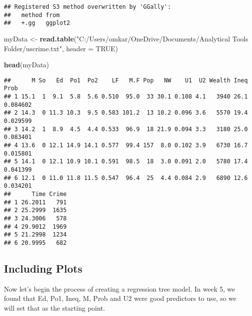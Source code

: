 \documentclass[
]{article}
\newenvironment{Shaded}{\begin{snugshade}}{\end{snugshade}}
\newcommand{\AttributeTok}[1]{\textcolor[rgb]{0.13,0.29,0.53}{#1}}
\newcommand{\ConstantTok}[1]{\textcolor[rgb]{0.56,0.35,0.01}{#1}}
\newcommand{\FunctionTok}[1]{\textcolor[rgb]{0.13,0.29,0.53}{\textbf{#1}}}
\newcommand{\NormalTok}[1]{#1}
\newcommand{\OtherTok}[1]{\textcolor[rgb]{0.56,0.35,0.01}{#1}}
\newcommand{\StringTok}[1]{\textcolor[rgb]{0.31,0.60,0.02}{#1}}
\begin{document}
\begin{verbatim}
## Registered S3 method overwritten by 'GGally':
##   method from   
##   +.gg   ggplot2
\end{verbatim}

\begin{Shaded}
\begin{Highlighting}[]
\NormalTok{myData }\OtherTok{\textless{}{-}} \FunctionTok{read.table}\NormalTok{(}\StringTok{"C:/Users/omkar/OneDrive/Documents/Analytical Tools Folder/uscrime.txt"}\NormalTok{, }\AttributeTok{header =} \ConstantTok{TRUE}\NormalTok{)}

\FunctionTok{head}\NormalTok{(myData)}
\end{Highlighting}
\end{Shaded}

\begin{verbatim}
##      M So   Ed  Po1  Po2    LF   M.F Pop   NW    U1  U2 Wealth Ineq     Prob
## 1 15.1  1  9.1  5.8  5.6 0.510  95.0  33 30.1 0.108 4.1   3940 26.1 0.084602
## 2 14.3  0 11.3 10.3  9.5 0.583 101.2  13 10.2 0.096 3.6   5570 19.4 0.029599
## 3 14.2  1  8.9  4.5  4.4 0.533  96.9  18 21.9 0.094 3.3   3180 25.0 0.083401
## 4 13.6  0 12.1 14.9 14.1 0.577  99.4 157  8.0 0.102 3.9   6730 16.7 0.015801
## 5 14.1  0 12.1 10.9 10.1 0.591  98.5  18  3.0 0.091 2.0   5780 17.4 0.041399
## 6 12.1  0 11.0 11.8 11.5 0.547  96.4  25  4.4 0.084 2.9   6890 12.6 0.034201
##      Time Crime
## 1 26.2011   791
## 2 25.2999  1635
## 3 24.3006   578
## 4 29.9012  1969
## 5 21.2998  1234
## 6 20.9995   682
\end{verbatim}

\hypertarget{including-plots}{%
\subsection{Including Plots}\label{including-plots}}

Now let's begin the process of creating a regression tree model. In week
5, we found that Ed, Po1, Ineq, M, Prob and U2 were good predictors to
use, so we will set that as the starting point.
\end{document}
